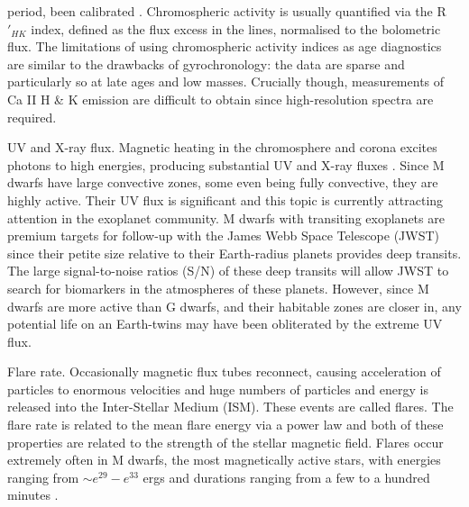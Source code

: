 \begin{itemize}
{{period, been calibrated \citep[\eg][]{Soderblom1991, Donahue1993,
Lachaume1999, Mamajek2008}.
Chromospheric activity is usually quantified via the R$\prime_{HK}$ index,
defined as the flux excess in the lines, normalised to the bolometric flux.
The limitations of using chromospheric activity indices as age diagnostics are
similar to the drawbacks of gyrochronology: the data are sparse and
particularly so at late ages and low masses.
Crucially though, measurements of Ca II H \& K emission are difficult to
obtain since high-resolution spectra are required.
}
\item{UV and X-ray flux.}
Magnetic heating in the chromosphere and corona excites photons to high
energies, producing substantial UV and X-ray fluxes
\citep[\eg][]{Pallavicini1981}.
Since M dwarfs have large convective zones, some even being fully convective,
they are highly active.
Their UV flux is significant and this topic is currently attracting attention
in the exoplanet community.
M dwarfs with transiting exoplanets are premium targets for follow-up with the
James Webb Space Telescope (JWST) since their petite size relative to their
Earth-radius planets provides deep transits.
The large signal-to-noise ratios (S/N) of these deep transits will allow JWST
to search for biomarkers in the atmospheres of these planets.
However, since M dwarfs are more active than G dwarfs, and their habitable
zones are closer in, any potential life on an Earth-twins may have been
obliterated by the extreme UV flux.}
\item{Flare rate.
Occasionally magnetic flux tubes reconnect, causing acceleration of particles
to enormous velocities and huge numbers of particles and energy is released
into the Inter-Stellar Medium (ISM).
These events are called flares.
The flare rate is related to the mean flare energy via a power law
\citep{Hawley2014, Davenport2015} and both of these properties are related to
the strength of the stellar magnetic field.
Flares occur extremely often in M dwarfs, the most magnetically active stars,
with energies ranging from $\sim e^{29} - e^{33}$ ergs and durations ranging
from a few to a hundred minutes \citep{Hawley2014}.}
\end{itemize}

